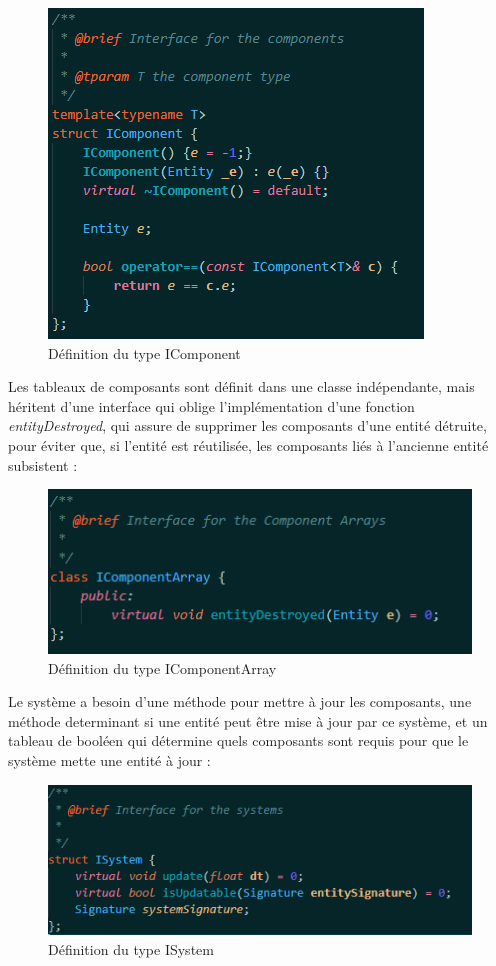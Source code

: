 \documentclass[12pt, openany]{report}
\begin{document}
\begin{figure}[!h]
\centering
\includegraphics[scale=1]{component.png}
\caption{D\'efinition du type IComponent}
\end{figure}
\newpage
\par Les tableaux de composants sont d\'efinit dans une classe ind\'ependante, mais h\'eritent d'une interface qui oblige l'impl\'ementation d'une fonction \textit{entityDestroyed}, qui assure de supprimer les composants d'une entit\'e d\'etruite, pour \'eviter que, si l'entit\'e est r\'eutilis\'ee, les composants li\'es \`a l'ancienne entit\'e subsistent :
\begin{figure}[!h]
\centering
\includegraphics[scale=1]{compArr.png}
\caption{D\'efinition du type IComponentArray}
\end{figure}
\par Le syst\`eme a besoin d'une m\'ethode pour mettre \`a jour les composants, une m\'ethode determinant si une entit\'e peut \^etre mise \`a jour par ce syst\`eme, et un tableau de bool\'een qui d\'etermine quels composants sont requis pour que le syst\`eme mette une entit\'e \`a jour :
\begin{figure}[!h]
\centering
\includegraphics[scale=1]{system.png}
\caption{D\'efinition du type ISystem}
\end{figure}
\end{document}

